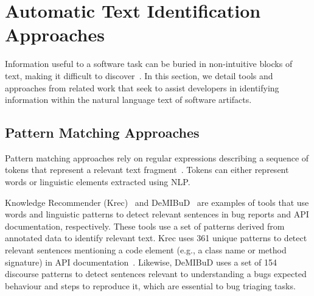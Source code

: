 \section{Automatic Text Identification Approaches}
\label{cp2:automatic-approaches}



Information useful to a software task can be buried in  
non-intuitive blocks of text, making it difficult to discover~\cite{Robillard2015}.
In this section, we detail tools and approaches from related work
that seek to assist developers in 
identifying information within the natural language
text of software artifacts.





\subsection{Pattern Matching Approaches}
\label{cp2:pattern-matching}


Pattern matching approaches rely on regular expressions describing a sequence of tokens that represent
 a relevant text fragment~\cite{Bavota2016}. Tokens can either represent words or linguistic elements 
extracted using \acf{NLP}.
    

Knowledge Recommender (Krec)~\cite{Robillard2015} 
and {\small DeMIBuD}~\cite{Chaparro2017} are examples 
of tools that use words and linguistic patterns to 
detect relevant sentences in bug reports and API documentation, respectively. 
These tools use a set of patterns derived from annotated data to identify relevant text. Krec  uses  361 unique patterns
to 
detect relevant sentences mentioning a 
code element (e.g., a class name or method signature) in API documentation~\cite{Robillard2015}.
Likewise, {\small DeMIBuD} uses a set of 154 discourse patterns to detect sentences 
relevant to understanding a bugs expected behaviour and steps to reproduce it,
which are essential to bug triaging tasks.







